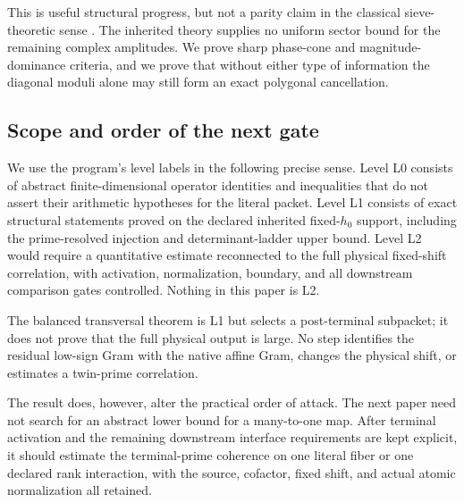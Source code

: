 This is useful structural progress, but not a parity claim in the classical
sieve-theoretic sense \citep[Ch.~16]{FriedlanderIwaniec2010}.  The inherited
theory supplies no uniform sector bound for the remaining complex
amplitudes.  We prove sharp phase-cone and magnitude-dominance criteria,
and we prove that without either type of information the diagonal moduli
alone may still form an exact polygonal cancellation.

\subsection{Scope and order of the next gate}

We use the program's level labels in the following precise sense.
Level L0 consists of abstract finite-dimensional operator identities and
inequalities that do not assert their arithmetic hypotheses for the
literal packet.  Level L1 consists of exact structural statements proved
on the declared inherited fixed-\(h_0\) support, including the
prime-resolved injection and determinant-ladder upper bound.  Level L2
would require a quantitative estimate reconnected to the full physical
fixed-shift correlation, with activation, normalization, boundary, and
all downstream comparison gates controlled.  Nothing in this paper is
L2.

The balanced transversal theorem is L1 but selects a post-terminal
subpacket; it does not prove that the full physical output is large.  No
step identifies the residual low-sign Gram with the native affine Gram,
changes the physical shift, or estimates a twin-prime correlation.

The result does, however, alter the practical order of attack.  The next
paper need not search for an abstract lower bound for a many-to-one map.
After terminal activation and the remaining downstream interface
requirements are kept explicit, it should estimate the terminal-prime
coherence on one literal fiber or one declared rank interaction, with the
source, cofactor, fixed shift, and actual atomic normalization all retained.
